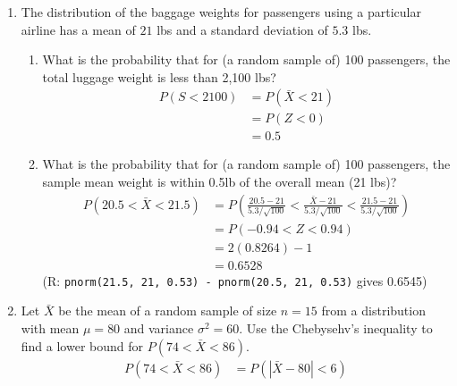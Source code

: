 \documentclass[12pt]{article} %
\newcommand{\Red}{\color{Red}}
\begin{document}
\begin{enumerate}
\begin{enumerate}
{$$\begin{aligned}
    p &= P(\text{Poisson}(0.6) = 0) \\
    &= e^{-0.6}
\end{aligned}$$ By normal approximation, we have $$\begin{aligned}
    P(Y < 190) &= P(Y \leq 189) \\
    &= P\left(Z \leq \frac{189+0.5-365 \cdot e^{-0.6}}{\sqrt{365 \cdot e^{-0.6}(1-e^{-0.6})}}\right) \\
    &= 0.1276
\end{aligned}$$
(R: \texttt{p <- exp(-0.6); pnorm(189.5, 365*p, sqrt(365*p*(1-p)))} gives 0.1276)}
\end{enumerate}
\newpage
\item The distribution of the baggage weights for passengers using a particular airline has a mean of $21$ lbs and a standard deviation of $5.3$ lbs. 
\begin{enumerate}
\item What is the probability that for (a random sample of) 100 passengers, the total luggage weight is less than 2,100 lbs? \\ {\Red $$\begin{aligned}
    P(S < 2100) &= P(\bar{X} < 21) \\
    &= P(Z < 0) \\
    &= 0.5
\end{aligned}$$}
\item What is the probability that for (a random sample of) 100 passengers, the sample mean weight is within 0.5lb of the overall mean (21 lbs)? {\Red $$\begin{aligned}
    P(20.5 < \bar{X} < 21.5) &= P\left(\frac{20.5-21}{5.3/\sqrt{100}} < \frac{\bar{X}-21}{5.3/\sqrt{100}} < \frac{21.5-21}{5.3/\sqrt{100}}\right) \\
    &= P(-0.94 < Z < 0.94) \\
    &= 2(0.8264) - 1 \\
    &= 0.6528
\end{aligned}$$
(R: \texttt{pnorm(21.5, 21, 0.53) - pnorm(20.5, 21, 0.53)} gives 0.6545)}
\end{enumerate}
\newpage
\item Let $\bar{X}$ be the mean of a random sample of size $n=15$ from a distribution with mean $\mu=80$ and variance $\sigma^2=60$.  Use the Chebysehv's inequality to find a lower bound for $P(74<\bar{X}<86)$. \\ {\Red $$\begin{aligned}
    P(74 < \bar{X} < 86) &= P(|\bar{X}-80| < 6) \\

\end{aligned}$$}
\end{enumerate}
\end{document}
